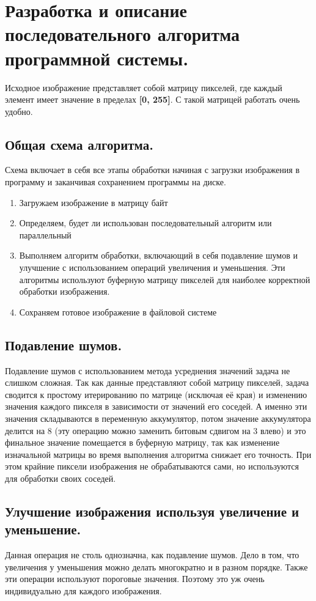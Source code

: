 \newpage


\section{Разработка и описание последовательного алгоритма программной системы.}\label{sec:devalgorythms}
Исходное изображение представляет собой матрицу пикселей, где каждый элемент имеет значение в пределах \textbf{[0, 255]}.
С такой матрицей работать очень удобно.

\subsection{Общая схема алгоритма.}\label{subsec:devalgorythms}
Схема включает в себя все этапы обработки начиная с загрузки изображения в программу и заканчивая сохранением программы на диске.
\begin{enumerate}
    \item Загружаем изображение в матрицу байт
    \item Определяем, будет ли использован последовательный алгоритм или параллельный
    \item Выполняем алгоритм обработки, включающий в себя подавление шумов и улучшение с использованием операций увеличения и уменьшения.
    Эти алгоритмы используют буферную матрицу пикселей для наиболее корректной обработки изображения.
    \item Сохраняем готовое изображение в файловой системе
\end{enumerate}

\subsection{Подавление шумов.}\label{subsec:denoise}
Подавление шумов с использованием метода усреднения значений задача не слишком сложная.
Так как данные представляют собой матрицу пикселей, задача сводится к простому итерированию по матрице (исключая её края) и изменению значения каждого пикселя в зависимости от значений его соседей.
А именно эти значения складываются в переменную аккумулятор, потом значение аккумулятора делится на 8 (эту операцию можно заменить битовым сдвигом на 3 влево) и это финальное значение помещается в буферную матрицу, так как изменение изначальной матрицы во время выполнения алгоритма снижает его точность.
При этом крайние пиксели изображения не обрабатываются сами, но используются для обработки своих соседей.

\subsection{Улучшение изображения используя увеличение и уменьшение.}\label{subsec:upgrade}
Данная операция не столь однозначна, как подавление шумов.
Дело в том, что увеличения у уменьшения можно делать многократно и в разном порядке.
Также эти операции используют пороговые значения.
Поэтому это уж очень индивидуально для каждого изображения.

